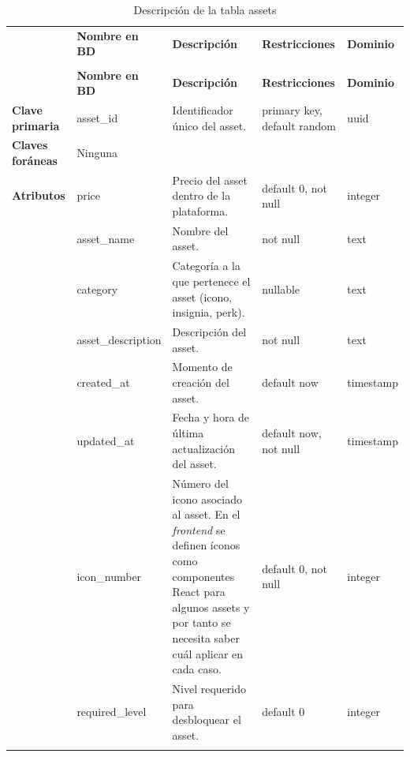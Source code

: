 \renewcommand{\arraystretch}{1.35}
\setlength{\tabcolsep}{3pt}
\small

\begin{longtable}{|
>{\raggedright\arraybackslash}p{1.9cm}|
>{\raggedright\arraybackslash}p{2.7cm}|
>{\raggedright\arraybackslash}p{4.9cm}|
>{\raggedright\arraybackslash}p{2.7cm}|
>{\raggedright\arraybackslash}p{2.1cm}|
}
\hline

\rowcolor[gray]{0.75}
\multicolumn{5}{|c|}{\textbf{Assets}} \\
\hline

 & \textbf{Nombre en BD} & \textbf{Descripción} & \textbf{Restricciones} & \textbf{Dominio} \\
\hline
\endfirsthead

\hline
\rowcolor[gray]{0.75}
\multicolumn{5}{|c|}{\textbf{Assets}} \\
\hline

 & \textbf{Nombre en BD} & \textbf{Descripción} & \textbf{Restricciones} & \textbf{Dominio} \\
\hline
\endhead

\textbf{Clave primaria}
& asset\_\allowbreak id
& Identificador único del asset.
& primary key, default random
& uuid \\
\hline

\textbf{Claves foráneas}
& Ninguna
& 
& 
&  \\
\hline

\textbf{Atributos}
& price
& Precio del asset dentro de la plataforma.
& default 0, not null
& integer \\
\cline{2-5}

& asset\_\allowbreak name
& Nombre del asset.
& not null
& text \\
\cline{2-5}

& category
& Categoría a la que pertenece el asset (icono, insignia, perk).
& nullable
& text \\
\cline{2-5}

& asset\_\allowbreak description
& Descripción del asset.
& not null
& text \\
\cline{2-5}

& created\_\allowbreak at
& Momento de creación del asset.
& default now
& timestamp \\
\cline{2-5}

& updated\_\allowbreak at
& Fecha y hora de última actualización del asset.
& default now, not null
& timestamp \\
\cline{2-5}

& icon\_\allowbreak number
& Número del icono asociado al asset. En el \textit{frontend} se definen íconos como componentes React para algunos assets y por tanto se necesita saber cuál aplicar en cada caso. 
& default 0, not null
& integer \\
\cline{2-5}

& required\_\allowbreak level
& Nivel requerido para desbloquear el asset.
& default 0
& integer \\
\hline

\caption{Descripción de la tabla assets}
\end{longtable}


